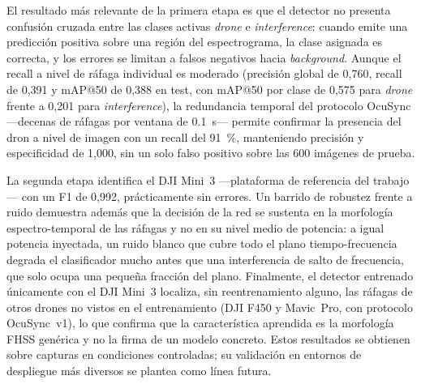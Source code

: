 El resultado más relevante de la primera etapa es que el detector no presenta confusión cruzada entre las clases activas \emph{drone} e \emph{interference}: cuando emite una predicción positiva sobre una región del espectrograma, la clase asignada es correcta, y los errores se limitan a falsos negativos hacia \emph{background}. Aunque el recall a nivel de ráfaga individual es moderado (precisión global de 0,760, recall de 0,391 y mAP@50 de 0,388 en test, con mAP@50 por clase de 0,575 para \emph{drone} frente a 0,201 para \emph{interference}), la redundancia temporal del protocolo OcuSync ---decenas de ráfagas por ventana de \SI{0.1}{\second}--- permite confirmar la presencia del dron a nivel de imagen con un recall del \SI{91}{\percent}, manteniendo precisión y especificidad de 1,000, sin un solo falso positivo sobre las 600 imágenes de prueba.

La segunda etapa identifica el DJI Mini~3 ---plataforma de referencia del trabajo--- con un F1 de 0,992, prácticamente sin errores. Un barrido de robustez frente a ruido demuestra además que la decisión de la red se sustenta en la morfología espectro-temporal de las ráfagas y no en su nivel medio de potencia: a igual potencia inyectada, un ruido blanco que cubre todo el plano tiempo-frecuencia degrada el clasificador mucho antes que una interferencia de salto de frecuencia, que solo ocupa una pequeña fracción del plano. Finalmente, el detector entrenado únicamente con el DJI Mini~3 localiza, sin reentrenamiento alguno, las ráfagas de otros drones no vistos en el entrenamiento (DJI F450 y Mavic~Pro, con protocolo OcuSync~v1), lo que confirma que la característica aprendida es la morfología FHSS genérica y no la firma de un modelo concreto. Estos resultados se obtienen sobre capturas en condiciones controladas; su validación en entornos de despliegue más diversos se plantea como línea futura.

\cleardoublepage
